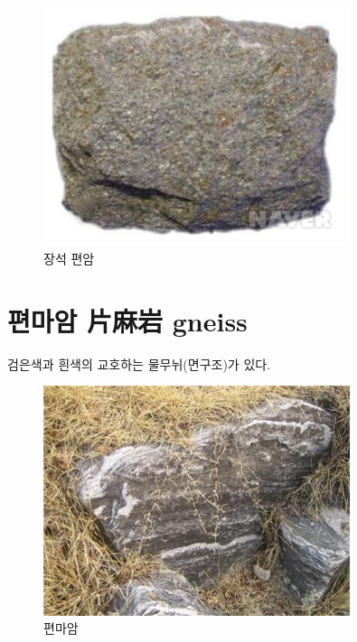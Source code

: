 \documentclass[12pt, a4paper, twoside]{book}
\begin{document}
				
				\begin{figure}
				\centering
				\caption{장석 편암}
				\includegraphics[width=0.8\textwidth]{./fig/schist_0003.jpg}
				\end{figure}
				
				
				
				




















	\clearpage
	\section{편마암 片麻岩  gneiss }
	


			검은색과 흰색의 교호하는 물무뉘(면구조)가 있다.


				\begin{figure}[h]
				\centering
				\caption{편마암}
				\includegraphics[width=0.8\textwidth]{./fig/gneiss_0001.jpg}
				\end{figure}
\end{document}
